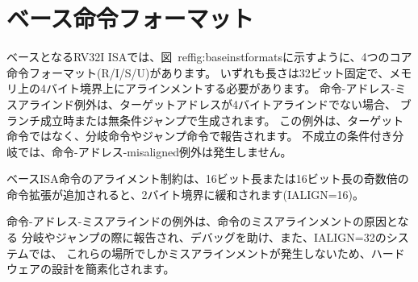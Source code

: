 \section{ベース命令フォーマット}

ベースとなるRV32I ISAでは、図~ref{fig:baseinstformats}に示すように、4つのコア命令フォーマット(R/I/S/U)があります。
いずれも長さは32ビット固定で、メモリ上の4バイト境界上にアラインメントする必要があります。 
命令-アドレス-ミスアラインド例外は、ターゲットアドレスが4バイトアラインドでない場合、
ブランチ成立時または無条件ジャンプで生成されます。
この例外は、ターゲット命令ではなく、分岐命令やジャンプ命令で報告されます。
不成立の条件付き分岐では、命令-アドレス-misaligned例外は発生しません。

\begin{comment}
\begin{commentary}
The alignment constraint for base ISA instructions is relaxed to a
two-byte boundary when instruction extensions with 16-bit lengths or
other odd multiples of 16-bit lengths are added (i.e., IALIGN=16).

Instruction-address-misaligned exceptions are reported on the branch
or jump that would cause instruction misalignment to help debugging,
and to simplify hardware design for systems with IALIGN=32, where these
are the only places where misalignment can occur.
\end{commentary}
\end{comment}

\begin{commentary}
ベースISA命令のアライメント制約は、16ビット長または16ビット長の奇数倍の
命令拡張が追加されると、2バイト境界に緩和されます(IALIGN=16)。

命令-アドレス-ミスアラインドの例外は、命令のミスアラインメントの原因となる
分岐やジャンプの際に報告され、デバッグを助け、また、IALIGN=32のシステムでは、
これらの場所でしかミスアラインメントが発生しないため、ハードウェアの設計を簡素化されます。
\end{commentary}

\begin{comment}
The behavior upon decoding a reserved instruction is \unspecified.
\begin{commentary}
Some platforms may require that opcodes reserved for standard use raise
an illegal-instruction exception.
Other platforms may permit reserved opcode space be used for non-conforming
extensions.
\end{commentary}
\end{comment}

